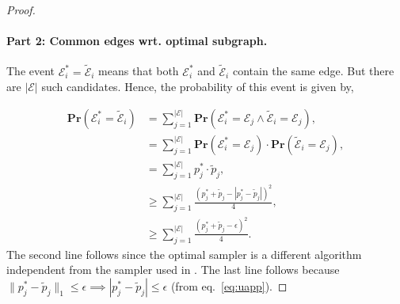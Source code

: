 \begin{proof}
\paragraph{Part 2: Common edges wrt. optimal subgraph.}

The event $\mathcal{E}_i^* = \mathcal{\tilde{E}}_i$ means that both $\mathcal{E}_i^*$ and $\mathcal{\tilde{E}}_i$ contain the same edge. But there are $|\mathcal{E}|$ such candidates. Hence, the probability of this event is given by,

\begin{align*}
    \mathbf{Pr}(\mathcal{E}_i^* = \mathcal{\tilde{E}}_i) &= \sum_{j=1}^{|\mathcal{E}|} \mathbf{Pr}(\mathcal{E}_i^* = \mathcal{E}_j \land \mathcal{\tilde{E}}_i = \mathcal{E}_j), \\
    &= \sum_{j=1}^{|\mathcal{E}|} \mathbf{Pr}(\mathcal{E}_i^* = \mathcal{E}_j) \cdot \mathbf{Pr}(\mathcal{\tilde{E}}_i = \mathcal{E}_j), \\
    & = \sum_{j=1}^{|\mathcal{E}|} p^*_j \cdot \tilde{p}_j, \\
    &\geq \sum_{j=1}^{|\mathcal{E}|} \frac{(p^*_j + \tilde{p}_j - |p^*_j - \tilde{p}_j|)^2}{4}, \\
    & \geq \sum_{j=1}^{|\mathcal{E}|} \frac{(p^*_j + \tilde{p}_j - \epsilon)^2}{4}.
\end{align*}
The second line follows since the optimal sampler is a different algorithm independent from the sampler used in \sgs. The last line follows because $\|p^*_j - \tilde{p}_j\|_1 \leq \epsilon \implies |p^*_j - \tilde{p}_j| \leq \epsilon$ (from eq.~\ref{eq:uapp}). 
\end{proof}


